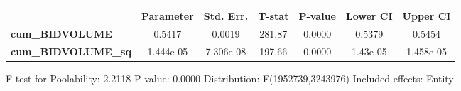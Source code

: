 \begin{center}
\begin{tabular}{lclc}
\bottomrule
\end{tabular}
\begin{tabular}{lcccccc}
                            & \textbf{Parameter} & \textbf{Std. Err.} & \textbf{T-stat} & \textbf{P-value} & \textbf{Lower CI} & \textbf{Upper CI}  \\
\midrule
\textbf{cum\_BIDVOLUME}     &       0.5417       &       0.0019       &      281.87     &      0.0000      &       0.5379      &       0.5454       \\
\textbf{cum\_BIDVOLUME\_sq} &     1.444e-05      &     7.306e-08      &      197.66     &      0.0000      &      1.43e-05     &     1.458e-05      \\
\bottomrule
\end{tabular}
\end{center}

F-test for Poolability: 2.2118 \newline
 P-value: 0.0000 \newline
 Distribution: F(1952739,3243976) \newline
  \newline
 Included effects: Entity